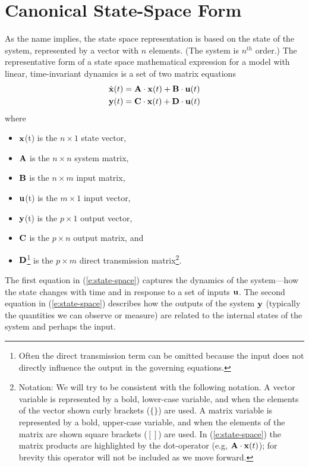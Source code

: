 \section{Canonical State-Space Form}
As the name implies, the state space representation is based on the state of the system, represented by a vector with $n$ elements. (The system is $n^{th}$ order.)  The representative form of a state space mathematical expression for a model with linear, time-invariant dynamics is a set of two matrix equations
\begin{align}\label{e:state-space}
\dot{\mbox{${\bf x}$}}(t) & = \mbox{${\bf A}$} \cdot \mbox{${\bf x}$}(t) + \mbox{${\bf B}$} \cdot \mbox{${\bf u}$}(t) \nonumber \\
\mbox{${\bf y}$}(t) & = \mbox{${\bf C}$} \cdot \mbox{${\bf x}$}(t) + \mbox{${\bf D}$} \cdot \mbox{${\bf u}$}(t)
\end{align}
where
\begin{itemize}
\item $\mbox{${\bf x}$}$(t) is the $n \times 1$ state vector,
\item $\mbox{${\bf A}$}$ is the $n \times n$ system matrix,
\item $\mbox{${\bf B}$}$ is the $n \times m$ input matrix,
\item $\mbox{${\bf u}$}$(t) is the $m \times 1$ input vector,
\item $\mbox{${\bf y}$}$(t) is the $p \times 1$ output vector,
\item $\mbox{${\bf C}$}$ is the $p \times n$ output matrix, and
\item $\mbox{${\bf D}$}$\footnote{Often the direct transmission term can be omitted because the input does not directly influence the output in the governing equations.} is the $p \times m$ direct transmission matrix\footnote{
Notation: We will try to be consistent with the following notation.  A vector variable is represented by a bold, lower-case variable, and when the elements of the vector shown curly brackets ($\mathbf{\{\}}$) are used.  A matrix variable is represented by a bold, upper-case variable, and when the elements of the matrix are shown square brackets ($\mathbf{[]}$) are used.  In (\ref{e:state-space}) the matrix products are highlighted by the dot-operator (e.g, $\mbox{${\bf A}$} \cdot \mbox{${\bf x}$}(t)$); for brevity this operator will not be included as we move forward.
}.
\end{itemize}
The first equation in (\ref{e:state-space}) captures the dynamics of the system---how the state changes with time and in response to a set of inputs $\mbox{${\bf u}$}$.  The second equation in (\ref{e:state-space}) describes how the outputs of the system $\mbox{${\bf y}$}$ (typically the quantities we can observe or measure) are related to the internal states of the system and perhaps the input.




